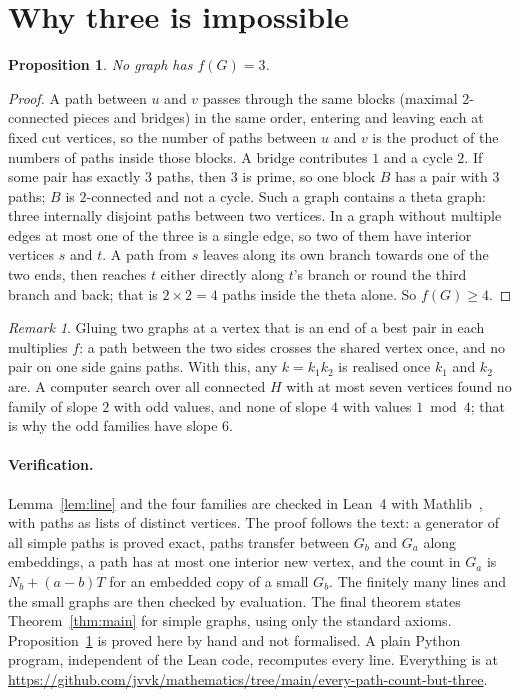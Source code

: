 \documentclass[11pt]{article}
\newtheorem{proposition}{Proposition}
\theoremstyle{remark}
\newtheorem*{remark}{Remark}
\begin{document}
\section{Why three is impossible}

\begin{proposition}\label{prop:three}
No graph has $f(G)=3$.
\end{proposition}

\begin{proof}
A path between $u$ and $v$ passes through the same blocks (maximal $2$-connected pieces and bridges) in the
same order, entering and leaving each at fixed cut vertices, so the number of paths between $u$ and $v$ is the product of
the numbers of paths inside those blocks. A bridge contributes $1$ and a cycle $2$. If some pair has exactly
$3$ paths, then $3$ is prime, so one block $B$ has a pair with $3$ paths; $B$ is $2$-connected and not a cycle.
Such a graph contains a theta graph: three internally disjoint paths between two vertices. In a graph without
multiple edges at most one of the three is a single edge, so two of them have interior vertices $s$ and $t$. A
path from $s$ leaves along its own branch towards one of the two ends, then reaches $t$ either directly along
$t$'s branch or round the third branch and back; that is $2\times2=4$ paths inside the theta alone. So
$f(G)\ge4$.
\end{proof}

\begin{remark}\label{rem:glue}
Gluing two graphs at a vertex that is an end of a best pair in each multiplies $f$: a path between the two sides
crosses the shared vertex once, and no pair on one side gains paths. With this, any $k=k_1k_2$ is realised once
$k_1$ and $k_2$ are. A computer search over all connected $H$ with at most seven vertices found no family of slope $2$
with odd values, and none of slope $4$ with values $1 \bmod 4$; that is why the odd families have slope $6$.
\end{remark}

\paragraph{Verification.} Lemma~\ref{lem:line} and the four families are checked in Lean~4 with
Mathlib~\cite{mathlib}, with paths as lists of distinct vertices. The proof follows the text: a generator of
all simple paths is proved exact, paths transfer between $G_b$ and $G_a$ along embeddings, a path has at most
one interior new vertex, and the count in $G_a$ is $N_b+(a-b)T$ for an embedded copy of a small $G_b$. The
finitely many lines and the small graphs are then checked by evaluation. The final theorem states
Theorem~\ref{thm:main} for simple graphs, using only the standard axioms. Proposition~\ref{prop:three} is
proved here by hand and not formalised. A plain Python program, independent of the Lean code, recomputes every
line. Everything is at \url{https://github.com/jvvk/mathematics/tree/main/every-path-count-but-three}.
\end{document}
